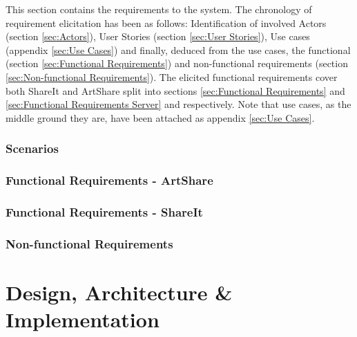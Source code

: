\documentclass{report}
\begin{document}



This section contains the requirements to the system. The chronology of requirement elicitation has been as follows: Identification of involved Actors (section \ref{sec:Actors}), User Stories (section \ref{sec:User Stories}), Use cases (appendix \ref{sec:Use Cases}) and finally, deduced from the use cases, the functional (section \ref{sec:Functional Requirements}) and non-functional requirements (section \ref{sec:Non-functional Requirements}). The elicited functional requirements cover both ShareIt and ArtShare split into sections \ref{sec:Functional Requirements} and \ref{sec:Functional Requirements Server} and respectively. Note that use cases, as the middle ground they are, have been attached as appendix \ref{sec:Use Cases}.


\subsection{Scenarios}







\FloatBarrier
\newpage \subsection{Functional Requirements - ArtShare}


\newpage \subsection{Functional Requirements - ShareIt}


\newpage \subsection{Non-functional Requirements}


\chapter{Design, Architecture \& Implementation}
\end{document}
